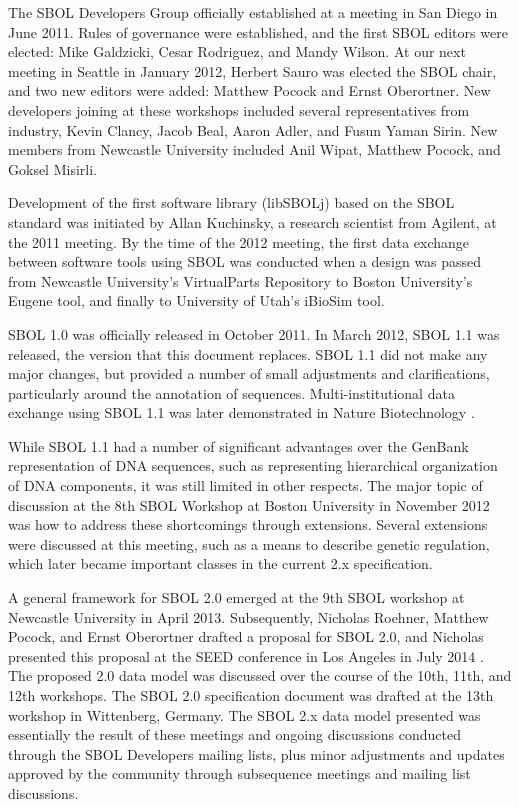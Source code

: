 The SBOL Developers Group  officially established at a meeting in San Diego in June 2011.  Rules of governance were established, and the first SBOL editors were elected: Mike Galdzicki, Cesar Rodriguez, and Mandy Wilson. At our next meeting in Seattle in January 2012, Herbert Sauro was elected the SBOL chair, and two new editors were added: Matthew Pocock and Ernst Oberortner.  New developers joining at these workshops included several representatives from industry, Kevin Clancy, Jacob Beal, Aaron Adler, and Fusun Yaman Sirin. New members from Newcastle University included Anil Wipat, Matthew Pocock, and Goksel Misirli.

Development of the first software library (libSBOLj) based on the SBOL standard was initiated by Allan Kuchinsky, a research scientist from Agilent, at the 2011 meeting.  By the time of the 2012 meeting, the first data exchange between software tools using SBOL was conducted when a design was passed from Newcastle University's VirtualParts Repository to Boston University's Eugene tool, and finally to University of Utah's iBioSim tool. 

SBOL 1.0 was officially released in October 2011.  In March 2012, SBOL 1.1 was released, the version that this document replaces. SBOL 1.1 did not make any major changes, but provided a number of small adjustments and clarifications, particularly around the annotation of sequences.  Multi-institutional data exchange using SBOL 1.1 was later demonstrated in Nature Biotechnology \cite{galdzicki2014synthetic}. 

While SBOL 1.1 had a number of significant advantages over the GenBank representation of DNA sequences, such as representing hierarchical organization of DNA components, it was still limited in other respects. The major topic of discussion at the 8th SBOL Workshop at Boston University in November 2012 was how to address these shortcomings through extensions.  Several extensions were discussed at this meeting, such as a means to describe genetic regulation, which later became important classes in the current 2.x specification.  

A general framework for SBOL 2.0 emerged at the 9th SBOL workshop at Newcastle University in April 2013.  Subsequently, Nicholas Roehner, Matthew Pocock, and Ernst Oberortner drafted a proposal for SBOL 2.0, and Nicholas presented this proposal at the SEED conference in Los Angeles in July 2014 \cite{roehner2014proposed}.  The proposed 2.0 data model was discussed over the course of the 10th, 11th, and 12th workshops.  
The SBOL 2.0 specification document was drafted at the 13th workshop in Wittenberg, Germany. The SBOL 2.x data model presented was essentially the result of these meetings and ongoing discussions conducted through the SBOL Developers mailing lists, plus minor adjustments and updates approved by the community through subsequence meetings and mailing list discussions.

